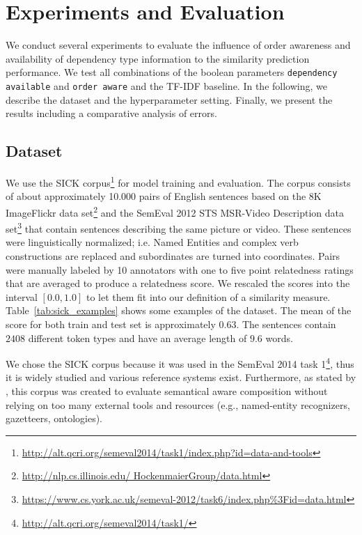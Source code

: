 \section{Experiments and Evaluation}
We conduct several experiments to evaluate the influence of order awareness and availability of dependency type information to the similarity prediction performance. We test all combinations of the boolean parameters \texttt{dependency available} and \texttt{order aware} and the TF-IDF baseline. In the following, we describe the dataset and the hyperparameter setting. Finally, we present the results including a comparative analysis of errors.

\subsection{Dataset}
We use the SICK corpus\footnote{\url{http://alt.qcri.org/semeval2014/task1/index.php?id=data-and-tools}} \autocite{marelli_sick_2014} for model training and evaluation. The corpus consists of about approximately 10.000 pairs of English sentences based on the 8K ImageFlickr data set\footnote{\url{http://nlp.cs.illinois.edu/
HockenmaierGroup/data.html}} \autocite{hodosh_framing_2013} and the SemEval 2012 STS MSR-Video Description data set\footnote{\url{https://www.cs.york.ac.uk/semeval-2012/task6/index.php\%3Fid=data.html}} \autocite{agirre_semeval-2012_2012} that contain sentences describing the same picture or video. These sentences were linguistically normalized; i.e. Named Entities and complex verb constructions are replaced and subordinates are turned into coordinates. Pairs were manually %
labeled by 10 annotators with one to five point relatedness ratings that are averaged to produce a relatedness score. We rescaled the scores into the interval $[0.0, 1.0]$ to let them fit into our definition of a similarity measure. Table~\ref{tab:sick_examples} shows some examples of the dataset. The mean of the score for both train and test set is approximately $0.63$. The sentences contain $2408$ different token types and have an average length of $9.6$ words.  

We chose the SICK corpus because it was used in the SemEval 2014 task 1\footnote{\url{http://alt.qcri.org/semeval2014/task1/}}, thus it is widely studied and various reference systems exist. Furthermore, as stated by \textcite{marelli_semeval-2014_2014}, this corpus was created to evaluate semantical aware composition without relying on too many external tools and resources (e.g., named-entity recognizers, gazetteers, ontologies).

